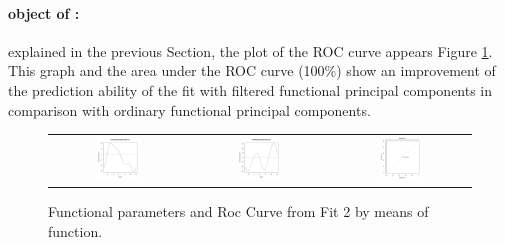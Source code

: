 \paragraph{ object of :} explained in the previous Section, the plot of the ROC curve appears Figure \ref{Fit2}. This graph and the area under the ROC curve (100\%) show an improvement of the prediction ability of the fit with filtered functional principal components in comparison with ordinary functional principal components.

\begin{figure}
\begin{center}
\begin{tabular}{ccc}
\includegraphics[width=0.33\textwidth]{Graphs/Fit2FunParam1.png} & \includegraphics[width=0.33\textwidth]{Graphs/Fit2FunParam2.png} 
& \includegraphics[width=0.33\textwidth]{Graphs/Fit2ROC.png}\\
\end{tabular}
\end{center}
\caption{Functional parameters and Roc Curve from Fit 2 by means of  function.}
\label{Fit2}
\end{figure}

